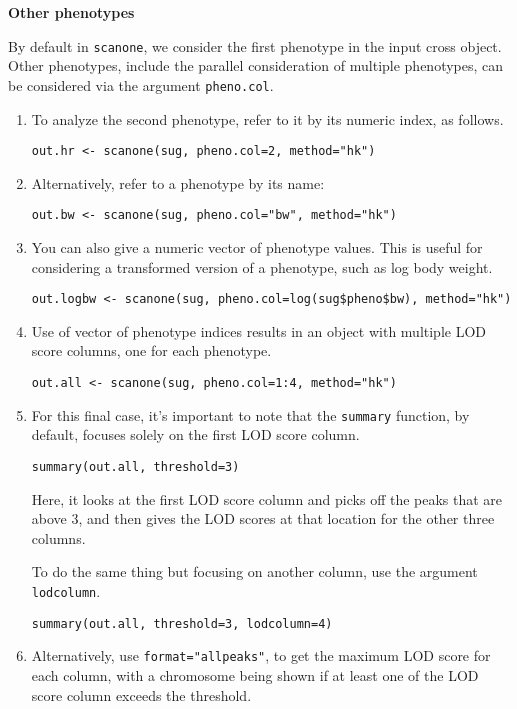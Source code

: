 \documentclass[10pt,letterpaper]{article}
\newcommand{\usercolor}{\color [named]{BlueViolet}}
\begin{document}
\vspace{12pt}
\textbf{Other phenotypes} \vspace{6pt}
\nopagebreak

By default in \verb-scanone-, we consider the first phenotype in the
input cross object.  Other phenotypes, include the parallel
consideration of multiple phenotypes, can be considered via the
argument \verb-pheno.col-.


\begin{enumerate}
\addtocounter{enumi}{38}
\item To analyze the second phenotype, refer to it by its numeric
  index, as follows.

\usercolor
\verb|out.hr <- scanone(sug, pheno.col=2, method="hk")|
\normalcolor

\item Alternatively, refer to a phenotype by its name:

\usercolor
\verb|out.bw <- scanone(sug, pheno.col="bw", method="hk")|
\normalcolor

\item You can also give a numeric vector of phenotype values.  This is
  useful for considering a transformed version of a phenotype, such as
  log body weight.

\usercolor
\verb|out.logbw <- scanone(sug, pheno.col=log(sug$pheno$bw), method="hk")|
\normalcolor

\item Use of vector of phenotype indices results in an object with
  multiple LOD score columns, one for each phenotype.

\usercolor
\verb|out.all <- scanone(sug, pheno.col=1:4, method="hk")|
\normalcolor

\item For this final case, it's important to note that the
  \verb-summary- function, by default, focuses solely on the first
  LOD score column.

\usercolor
\verb|summary(out.all, threshold=3)|
\normalcolor

Here, it looks at the first LOD score column and picks off the peaks
that are above 3, and then gives the LOD scores at that location for
the other three columns.  

To do the same thing but focusing on another column, use the argument
\verb-lodcolumn-. 

\usercolor
\verb|summary(out.all, threshold=3, lodcolumn=4)|
\normalcolor

\item Alternatively, use \verb-format="allpeaks"-, to get the maximum
  LOD score for each column, with a chromosome being shown if at least
  one of the LOD score column exceeds the threshold.


\end{enumerate}
\end{document}
